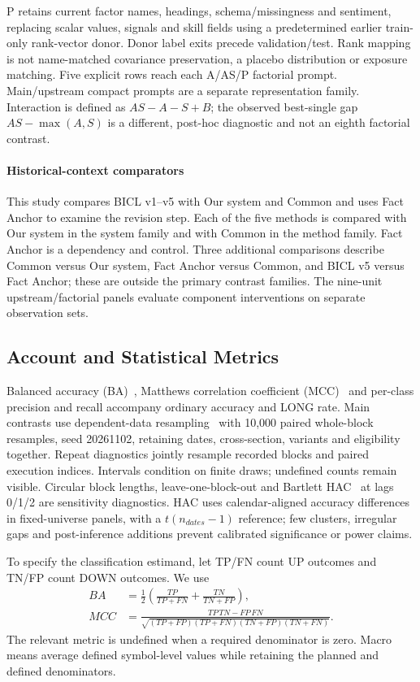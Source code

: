 P retains current factor names, headings, schema/missingness and sentiment, replacing scalar values, signals and skill fields using a predetermined earlier train-only rank-vector donor. Donor label exits precede validation/test. Rank mapping is not name-matched covariance preservation, a placebo distribution or exposure matching. Five explicit rows reach each A/AS/P factorial prompt. Main/upstream compact prompts are a separate representation family. Interaction is defined as $AS-A-S+B$; the observed best-single gap $AS-\max(A,S)$ is a different, post-hoc diagnostic and not an eighth factorial contrast.

\paragraph{Historical-context comparators}
This study compares BICL v1--v5 with Our system and Common and uses Fact Anchor to examine the revision step. Each of the five methods is compared with Our system in the system family and with Common in the method family. Fact Anchor is a dependency and control. Three additional comparisons describe Common versus Our system, Fact Anchor versus Common, and BICL v5 versus Fact Anchor; these are outside the primary contrast families. The nine-unit upstream/factorial panels evaluate component interventions on separate observation sets.

\subsection{Account and Statistical Metrics}
Balanced accuracy (BA)~\cite{brodersen2010balanced}, Matthews correlation coefficient (MCC)~\cite{chicco2020mcc} and per-class precision and recall accompany ordinary accuracy and LONG rate. Main contrasts use dependent-data resampling~\cite{lahiri2003resampling} with 10,000 paired whole-block resamples, seed 20261102, retaining dates, cross-section, variants and eligibility together. Repeat diagnostics jointly resample recorded blocks and paired execution indices. Intervals condition on finite draws; undefined counts remain visible. Circular block lengths, leave-one-block-out and Bartlett HAC~\cite{newey1987hac} at lags 0/1/2 are sensitivity diagnostics. HAC uses calendar-aligned accuracy differences in fixed-universe panels, with a $t(n_{dates}-1)$ reference; few clusters, irregular gaps and post-inference additions prevent calibrated significance or power claims.

To specify the classification estimand, let TP/FN count UP outcomes and TN/FP count DOWN outcomes. We use
\begin{equation}
 \begin{aligned}
 BA&=\frac12\left(\frac{TP}{TP+FN}+\frac{TN}{TN+FP}\right),\\
 MCC&=\frac{TP\,TN-FP\,FN}{\sqrt{(TP+FP)(TP+FN)(TN+FP)(TN+FN)}}.
 \end{aligned}
 \label{eq:classification_metrics}
\end{equation}
The relevant metric is undefined when a required denominator is zero. Macro means average defined symbol-level values while retaining the planned and defined denominators.

